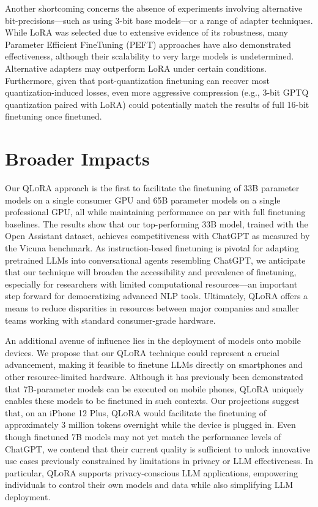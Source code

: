 Another shortcoming concerns the absence of experiments involving alternative bit-precisions—such as using 3-bit base models—or a range of adapter techniques. While LoRA was selected due to extensive evidence of its robustness, many Parameter Efficient FineTuning (PEFT) approaches have also demonstrated effectiveness, although their scalability to very large models is undetermined. Alternative adapters may outperform LoRA under certain conditions. Furthermore, given that post-quantization finetuning can recover most quantization-induced losses, even more aggressive compression (e.g., 3-bit GPTQ quantization paired with LoRA) could potentially match the results of full 16-bit finetuning once finetuned.

\section{Broader Impacts}

Our \textsc{QLoRA} approach is the first to facilitate the finetuning of 33B parameter models on a single consumer GPU and 65B parameter models on a single professional GPU, all while maintaining performance on par with full finetuning baselines. The results show that our top-performing 33B model, trained with the Open Assistant dataset, achieves competitiveness with ChatGPT as measured by the Vicuna benchmark. As instruction-based finetuning is pivotal for adapting pretrained LLMs into conversational agents resembling ChatGPT, we anticipate that our technique will broaden the accessibility and prevalence of finetuning, especially for researchers with limited computational resources—an important step forward for democratizing advanced NLP tools. Ultimately, \textsc{QLoRA} offers a means to reduce disparities in resources between major companies and smaller teams working with standard consumer-grade hardware.

An additional avenue of influence lies in the deployment of models onto mobile devices. We propose that our \textsc{QLoRA} technique could represent a crucial advancement, making it feasible to finetune LLMs directly on smartphones and other resource-limited hardware. Although it has previously been demonstrated that 7B-parameter models can be executed on mobile phones, \textsc{QLoRA} uniquely enables these models to be finetuned in such contexts. Our projections suggest that, on an iPhone 12 Plus, \textsc{QLoRA} would facilitate the finetuning of approximately 3 million tokens overnight while the device is plugged in. Even though finetuned 7B models may not yet match the performance levels of ChatGPT, we contend that their current quality is sufficient to unlock innovative use cases previously constrained by limitations in privacy or LLM effectiveness. In particular, \textsc{QLoRA} supports privacy-conscious LLM applications, empowering individuals to control their own models and data while also simplifying LLM deployment.

